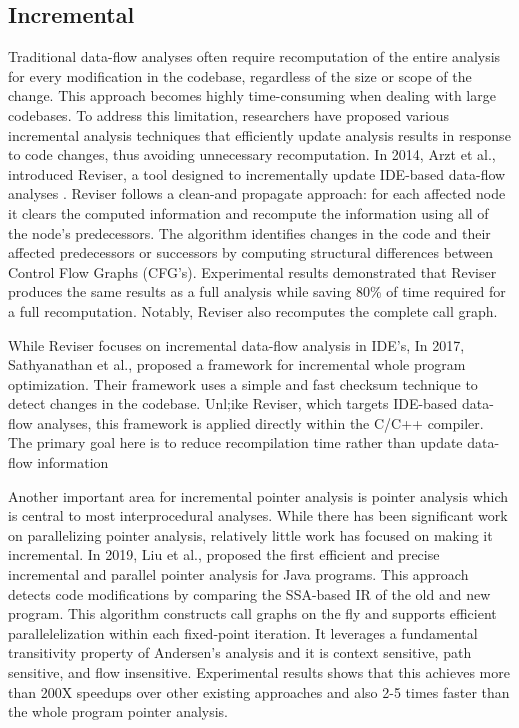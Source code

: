 \subsection{Incremental}

Traditional data-flow analyses often require recomputation of the entire analysis for every modification in the codebase, regardless of the size or scope of the change.
This approach becomes highly time-consuming when dealing with large codebases.
To address this limitation, researchers have proposed various incremental analysis techniques that efficiently update analysis results in response to code changes, thus avoiding unnecessary recomputation.
In 2014, Arzt et al., introduced Reviser, a tool designed to incrementally update IDE-based data-flow analyses \cite{arzt2014reviser}.
Reviser follows a clean-and propagate approach: for each affected node it clears the computed information and recompute the information using all of the node's predecessors.
The algorithm identifies changes in the code and their affected predecessors or successors by computing structural differences between Control Flow Graphs (CFG's).
Experimental results demonstrated that Reviser produces the same results as a full analysis while saving 80\% of time required for a full recomputation.
Notably, Reviser also recomputes the complete call graph.

While Reviser focuses on incremental data-flow analysis in IDE's, In 2017, Sathyanathan et al., \cite{sathyanathan2017incremental} proposed a framework for incremental whole program optimization.
Their framework uses a simple and fast checksum technique to detect changes in the codebase.
Unl;ike Reviser, which targets IDE-based data-flow analyses, this framework is applied directly within the C/C++ compiler.
The primary goal here is to reduce recompilation time rather than update data-flow information


Another important area for incremental pointer analysis is pointer analysis which is central to most interprocedural analyses.
While there has been significant work on parallelizing pointer analysis, relatively little work has focused on making it incremental. 
In 2019, Liu et al., \cite{liu2019rethinking} proposed the first efficient and precise incremental and parallel pointer analysis for Java programs.
This approach detects code modifications by comparing the SSA-based IR of the old and new program.
This algorithm constructs call graphs on the fly and supports efficient parallelelization within each fixed-point iteration.
It leverages a fundamental transitivity property of Andersen's analysis and it is context sensitive, path sensitive, and flow insensitive.
Experimental results shows that this achieves more than 200X speedups over other existing approaches and also 2-5 times faster than the whole program pointer analysis.

